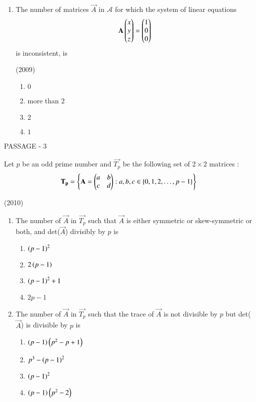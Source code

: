 \documentclass[journal,12pt,twocolumn]{IEEEtran}
\theoremstyle{remark}
\begin{document}
\begin{multicols}{2}
\begin{enumerate}
		\item The number of matrices $\vec{A}$ in $\mathcal{A}$ for which the system of linear equations
			$$\mathbf{A}\begin{pmatrix}x \\ y \\ z\end{pmatrix}=\begin{pmatrix}1 \\ 0 \\ 0\end{pmatrix}$$
			is inconsistent, is

			\hfill(2009)

			\begin{enumerate}
				\item $0$
				\item more than $2$
				\item $2$
				\item $1$
			\end{enumerate}
	\end{enumerate}

	\bigskip
	\columnbreak

	{\centering PASSAGE - 3 \par}

	\bigskip

	Let $p$ be an odd prime number and $\vec{T_p}$ be the following set of $2\times2$ matrices :
	$$\mathbf{T_p}=\left\{\mathbf{A}=\begin{pmatrix}a & b \\ c & d\end{pmatrix}:a,b,c\in\left\{0,1,2,\dots,p-1\right\}\right\}$$

			\hfill(2010)
	
	\begin{enumerate}
		\item The number of $\vec{A}$ in $\vec{T_p}$ such that $\vec{A}$ is either symmetric or skew-symmetric or both, and det($\vec{A}$) divisibly by $p$ is
			\begin{enumerate}
				\item $\left(p-1\right)^2$
				\item $2\left(p-1\right)$
				\item $\left(p-1\right)^2+1$
				\item $2p-1$
			\end{enumerate}


		\item The number of $\vec{A}$ in $\vec{T_p}$ such that the trace of $\vec{A}$ is not divisible by $p$ but det($\vec{A}$) is divisible by $p$ is

			
			\begin{enumerate}
				\item $\left(p-1\right)\left(p^2-p+1\right)$
				\item $p^3-\left(p-1\right)^2$
				\item $\left(p-1\right)^2$
				\item $\left(p-1\right)\left(p^2-2\right)$
			\end{enumerate}


\end{enumerate}
\end{multicols}
\end{document}
